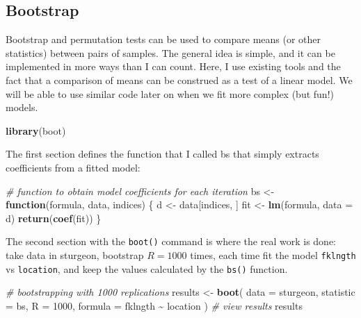 \documentclass[
  12pt,
]{book}
\newenvironment{Shaded}{\begin{snugshade}}{\end{snugshade}}
\newcommand{\CommentTok}[1]{\textcolor[rgb]{0.56,0.35,0.01}{\textit{#1}}}
\newcommand{\ControlFlowTok}[1]{\textcolor[rgb]{0.13,0.29,0.53}{\textbf{#1}}}
\newcommand{\DataTypeTok}[1]{\textcolor[rgb]{0.13,0.29,0.53}{#1}}
\newcommand{\DecValTok}[1]{\textcolor[rgb]{0.00,0.00,0.81}{#1}}
\newcommand{\KeywordTok}[1]{\textcolor[rgb]{0.13,0.29,0.53}{\textbf{#1}}}
\newcommand{\NormalTok}[1]{#1}
\newcommand{\OperatorTok}[1]{\textcolor[rgb]{0.81,0.36,0.00}{\textbf{#1}}}
\newcommand{\StringTok}[1]{\textcolor[rgb]{0.31,0.60,0.02}{#1}}
\begin{document}
\hypertarget{bootstrap}{%
\subsection{Bootstrap}\label{bootstrap}}

Bootstrap and permutation tests can be used to compare means (or other statistics) between pairs of samples. The general idea is simple, and it can be implemented in more ways than I can count. Here, I use existing tools and the fact that a comparison of means can be construed as a test of a linear model. We will be able to use similar code later on when we fit more complex (but fun!) models.

\begin{Shaded}
\begin{Highlighting}[]
\KeywordTok{library}\NormalTok{(boot)}
\end{Highlighting}
\end{Shaded}

The first section defines the function that I called bs that simply extracts coefficients from a fitted model:

\begin{Shaded}
\begin{Highlighting}[]
\CommentTok{\# function to obtain model coefficients for each iteration}
\NormalTok{bs \textless{}{-}}\StringTok{ }\ControlFlowTok{function}\NormalTok{(formula, data, indices) \{}
\NormalTok{  d \textless{}{-}}\StringTok{ }\NormalTok{data[indices, ]}
\NormalTok{  fit \textless{}{-}}\StringTok{ }\KeywordTok{lm}\NormalTok{(formula, }\DataTypeTok{data =}\NormalTok{ d)}
  \KeywordTok{return}\NormalTok{(}\KeywordTok{coef}\NormalTok{(fit))}
\NormalTok{\}}
\end{Highlighting}
\end{Shaded}

The second section with the \texttt{boot()} command is where the real work is done: take data in sturgeon, bootstrap \(R = 1000\) times, each time fit the model \texttt{fklngth} vs \texttt{location}, and keep the values calculated by the \texttt{bs()} function.

\begin{Shaded}
\begin{Highlighting}[]
\CommentTok{\# bootstrapping with 1000 replications}
\NormalTok{results \textless{}{-}}\StringTok{ }\KeywordTok{boot}\NormalTok{(}
  \DataTypeTok{data =}\NormalTok{ sturgeon, }\DataTypeTok{statistic =}\NormalTok{ bs, }\DataTypeTok{R =} \DecValTok{1000}\NormalTok{,}
  \DataTypeTok{formula =}\NormalTok{ fklngth }\OperatorTok{\textasciitilde{}}\StringTok{ }\NormalTok{location}
\NormalTok{)}
\CommentTok{\# view results}
\NormalTok{results}
\end{Highlighting}
\end{Shaded}
\end{document}
